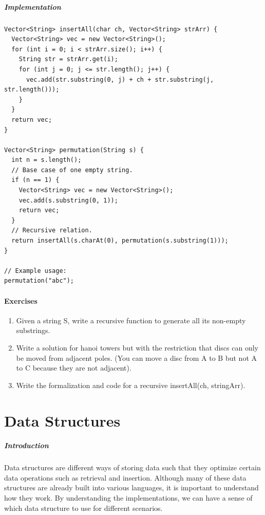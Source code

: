 \documentclass[11pt,oneside]{book}
\begin{document}
\subsubsection{Implementation}

\begin{lstlisting}
Vector<String> insertAll(char ch, Vector<String> strArr) {
  Vector<String> vec = new Vector<String>();
  for (int i = 0; i < strArr.size(); i++) {
    String str = strArr.get(i);
    for (int j = 0; j <= str.length(); j++) {
      vec.add(str.substring(0, j) + ch + str.substring(j, str.length()));
    }
  }
  return vec;
}

Vector<String> permutation(String s) {
  int n = s.length();
  // Base case of one empty string.
  if (n == 1) {
    Vector<String> vec = new Vector<String>();
    vec.add(s.substring(0, 1));
    return vec;
  }
  // Recursive relation.
  return insertAll(s.charAt(0), permutation(s.substring(1)));
}

// Example usage:
permutation("abc");
\end{lstlisting}

\subsection{Exercises}

\begin{enumerate}
\item Given a string S, write a recursive function to generate all its non-empty substrings.
\item Write a solution for hanoi towers but with the restriction that discs can only be moved from adjacent poles. (You can move a disc from A to B but not A to C because they are not adjacent).
\item Write the formalization and code for a recursive insertAll(ch, stringArr).
\end{enumerate}

\part{ Data Structures }
    \subsubsection{ Introduction }
    

Data structures are different ways of storing data such that they optimize certain data operations such as retrieval and insertion. Although many of these data structures are already built into various languages, it is important to understand how they work. By understanding the implementations, we can have a sense of which data structure to use for different scenarios.
\end{document}
